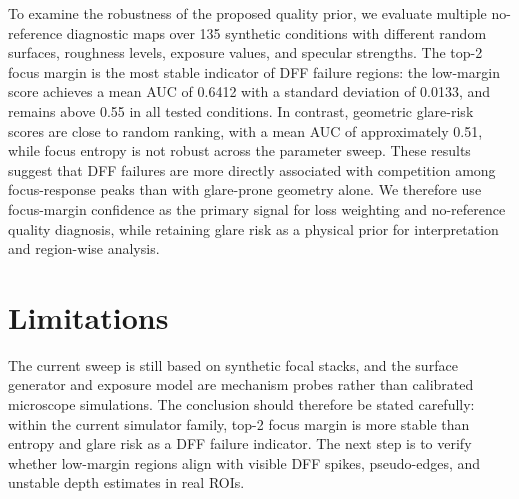 \documentclass[11pt]{article}
\begin{document}
To examine the robustness of the proposed quality prior, we evaluate multiple no-reference diagnostic maps over 135 synthetic conditions with different random surfaces, roughness levels, exposure values, and specular strengths. The top-2 focus margin is the most stable indicator of DFF failure regions: the low-margin score achieves a mean AUC of 0.6412 with a standard deviation of 0.0133, and remains above 0.55 in all tested conditions. In contrast, geometric glare-risk scores are close to random ranking, with a mean AUC of approximately 0.51, while focus entropy is not robust across the parameter sweep. These results suggest that DFF failures are more directly associated with competition among focus-response peaks than with glare-prone geometry alone. We therefore use focus-margin confidence as the primary signal for loss weighting and no-reference quality diagnosis, while retaining glare risk as a physical prior for interpretation and region-wise analysis.

\section{Limitations}

The current sweep is still based on synthetic focal stacks, and the surface generator and exposure model are mechanism probes rather than calibrated microscope simulations. The conclusion should therefore be stated carefully: within the current simulator family, top-2 focus margin is more stable than entropy and glare risk as a DFF failure indicator. The next step is to verify whether low-margin regions align with visible DFF spikes, pseudo-edges, and unstable depth estimates in real ROIs.
\end{document}
